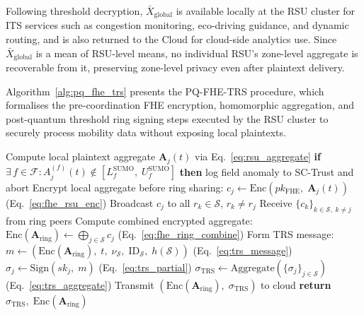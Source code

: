 \documentclass[12pt, a4paper]{report}
\begin{document}
Following threshold decryption, $\bar{X}_{\mathrm{global}}$ is
available locally at the RSU cluster for ITS services such as
congestion monitoring, eco-driving guidance, and dynamic routing,
and is also returned to the Cloud for cloud-side analytics use.
Since $\bar{X}_{\mathrm{global}}$ is a mean of RSU-level means,
no individual RSU's zone-level aggregate is recoverable from it,
preserving zone-level privacy even after plaintext delivery.

Algorithm~\ref{alg:pq_fhe_trs} presents the PQ-FHE-TRS procedure, which
formalises the pre-coordination FHE encryption, homomorphic aggregation,
and post-quantum threshold ring signing steps executed by the RSU cluster
to securely process mobility data without exposing local plaintexts.

\begin{algorithm}[htb]
\caption{Pre-Coordination FHE Encryption and PQ-TRS Signing
(\texttt{PQ-FHE-TRS})}
\begin{algorithmic}[1]
  \small
  \State Compute local plaintext aggregate $\mathbf{A}_j(t)$
         via Eq.~\eqref{eq:rsu_aggregate}
  \State \textbf{if} $\exists\, f \in \mathcal{F} :
         A_j^{(f)}(t) \notin
         [L_f^{\mathrm{SUMO}},\; U_f^{\mathrm{SUMO}}]$
         \textbf{then} log field anomaly to SC-Trust and abort
  \State Encrypt local aggregate before ring sharing:
         $c_j \gets \mathrm{Enc}(pk_{\mathrm{FHE}},\;
         \mathbf{A}_j(t))$
         \quad (Eq.~\eqref{eq:fhe_rsu_enc})
  \State Broadcast $c_j$ to all $r_k \in \mathcal{S}$,
         $r_k \neq r_j$
  \State Receive $\{c_k\}_{k \in \mathcal{S},\; k \neq j}$
         from ring peers
  \State Compute combined encrypted aggregate:
         $\mathrm{Enc}(\mathbf{A}_{\mathrm{ring}}) \gets
         \bigoplus_{j \in \mathcal{S}} c_j$
         \quad (Eq.~\eqref{eq:fhe_ring_combine})
  \State Form TRS message: $m \gets
         (\mathrm{Enc}(\mathbf{A}_{\mathrm{ring}}),\;
         t,\; \nu_{\mathcal{S}},\; \mathrm{ID}_{\mathcal{S}},\;
         h(\mathcal{S}))$
         \quad (Eq.~\eqref{eq:trs_message})
    \State $\sigma_j \gets \mathrm{Sign}(sk_j,\; m)$
           \quad (Eq.~\eqref{eq:trs_partial})
  \EndFor
  \State $\sigma_{\mathrm{TRS}} \gets
         \mathrm{Aggregate}(\{\sigma_j\}_{j \in \mathcal{S}})$
         \quad (Eq.~\eqref{eq:trs_aggregate})
  \State Transmit $(\mathrm{Enc}(\mathbf{A}_{\mathrm{ring}}),\;
         \sigma_{\mathrm{TRS}})$ to cloud
  \State \textbf{return} $\sigma_{\mathrm{TRS}},\;
         \mathrm{Enc}(\mathbf{A}_{\mathrm{ring}})$
  \EndProcedure
\end{algorithmic}
\label{alg:pq_fhe_trs}
\end{algorithm}
\end{document}
